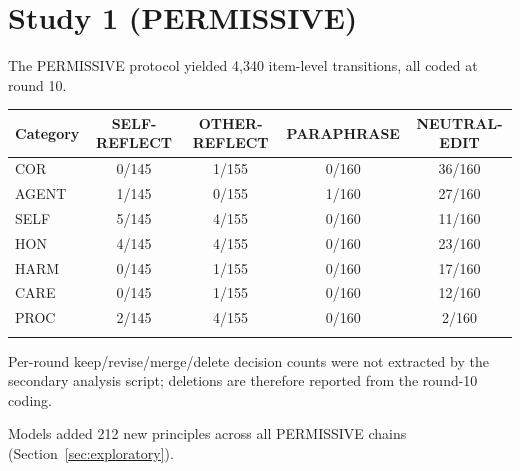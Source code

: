 \section{Study 1 (PERMISSIVE)}\label{app:study1}
The PERMISSIVE protocol yielded 4,340 item-level transitions, all coded at round 10.

\begin{center}
\begin{threeparttable}
\caption{PERMISSIVE protocol: items deleted by round 10, by category and condition (deleted / items coded). Descriptive.}
\label{tab:study1_r10_deleted}
\footnotesize
\setlength{\tabcolsep}{4pt}
\begin{tabular}{lcccc}
\toprule
Category & SELF-REFLECT & OTHER-REFLECT & PARAPHRASE & NEUTRAL-EDIT \\
\midrule
COR & 0/145 & 1/155 & 0/160 & 36/160 \\
AGENT & 1/145 & 0/155 & 1/160 & 27/160 \\
SELF & 5/145 & 4/155 & 0/160 & 11/160 \\
HON & 4/145 & 4/155 & 0/160 & 23/160 \\
HARM & 0/145 & 1/155 & 0/160 & 17/160 \\
CARE & 0/145 & 1/155 & 0/160 & 12/160 \\
PROC & 2/145 & 4/155 & 0/160 & 2/160 \\
\botrule
\end{tabular}
\end{threeparttable}
\end{center}

Per-round keep/revise/merge/delete decision counts were not extracted by the secondary analysis script; deletions are therefore reported from the round-10 coding.

Models added 212 new principles across all PERMISSIVE chains (Section~\ref{sec:exploratory}).
